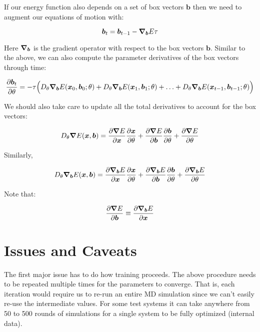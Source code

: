 \documentclass{article}
\begin{document}
If our energy function also depends on a set of box vectors $\bm{b}$ then we need to augment our equations of motion with:

\begin{equation}
\bm{b}_t = \bm{b}_{t-1} - \grad_{\bm{b}}E \tau
\end{equation}

Here $\grad_{\bm{b}}$ is the gradient operator with respect to the box vectors $\bm{b}$. Similar to the above, we can also compute the parameter derivatives of the box vectors through time:

\begin{equation}
\dfrac {\partial \bm{b}_t}{\partial \theta} = -\tau \Big( D_{\theta} \grad_{\bm{b}} E(\bm{x}_0,\bm{b}_0; \theta) + D_{\theta} \grad_{\bm{b}} E(\bm{x}_1,\bm{b}_1;\theta) + \ldots +  D_{\theta} \grad_{\bm{b}} E(\bm{x}_{t-1},\bm{b}_{t-1};\theta) \Big)
\end{equation}

We should also take care to update all the total derivatives to account for the box vectors:

\begin{equation}
D_{\theta} \grad E(\bm{x},\bm{b}) = \dfrac{\partial \grad E}{\partial \bm{x}} \dfrac{\partial \bm{x}} {\partial\theta} + \dfrac{\partial \grad E}{\partial \bm{b}} \dfrac{\partial \bm{b}} {\partial\theta} + \dfrac{\partial \grad E}{\partial \theta}
\end{equation}

Similarly,

\begin{equation}
D_{\theta} \grad_{\bm{b}} E(\bm{x},\bm{b}) = \dfrac{\partial \grad_{\bm{b}} E}{\partial \bm{x}} \dfrac{\partial \bm{x}} {\partial\theta} + \dfrac{\partial \grad_{\bm{b}} E}{\partial \bm{b}} \dfrac{\partial \bm{b}} {\partial\theta} + \dfrac{\partial \grad_{\bm{b}} E}{\partial \theta}
\end{equation}

Note that:

\begin{equation}
\dfrac{\partial \grad E}{\partial \bm{b}} \equiv \dfrac{\partial \grad_{\bm{b}} E}{\partial \bm{x}}
\end{equation}

\section{Issues and Caveats}

The first major issue has to do how training proceeds. The above procedure needs to be repeated multiple times for the parameters to converge. That is, each iteration would require us to re-run an entire MD simulation since we can't easily re-use the intermediate values. For some test systems it can take anywhere from 50 to 500 rounds of simulations for a single system to be fully optimized (internal data).
\end{document}
